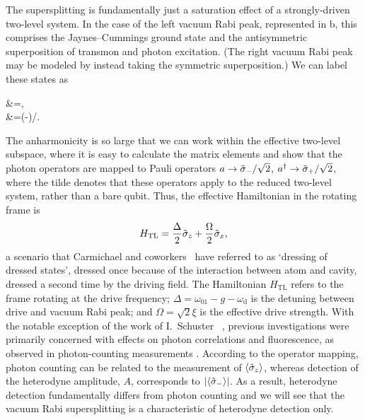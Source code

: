 The supersplitting is fundamentally just a saturation effect of a strongly-driven two-level system. In the case of the left vacuum Rabi peak, represented in b, this comprises the Jaynes--Cummings ground state and the antisymmetric superposition of transmon and photon excitation. (The right vacuum Rabi peak may be modeled by instead taking the symmetric superposition.) We can label these states as
\begin{subal}{\label{eq:dressdress}}
    \ket{\downarrow}&=,\quad{}\\
    \ket{\uparrow}&=(-)/.
\end{subal}
The anharmonicity is so large that we can work within the effective two-level subspace, where it is easy to calculate the matrix elements \cite{carmichael_statistical_2008} and show that the photon operators are mapped to Pauli operators $a\to\tilde{\sigma}_-/\sqrt{2}$, $a^\dag\to\tilde{\sigma}_+/\sqrt{2}$,%
where the tilde denotes that these operators apply to the reduced two-level system, rather than a bare qubit. Thus, the effective Hamiltonian in the rotating frame is
\begin{equation}\label{Htilde}
    H_\text{TL} = \frac{\Delta}{2}\tilde{\sigma}_z+\frac{\Omega}{2}\tilde{\sigma}_x,
\end{equation}%
a scenario that Carmichael and coworkers \cite{tian_quantum_1992, carmichael_statistical_2008}\ have referred to as `dressing of dressed states', dressed once because of the interaction between atom and cavity, dressed a second time by the driving field. The Hamiltonian $H_\text{TL}$ refers to the frame rotating at the drive frequency; $\Delta=\omega_{01} - g-\omega_\text{d}$ is the detuning between drive and vacuum Rabi peak; and $\Omega=\sqrt{2}\xi$ is the effective drive strength. With the notable exception of the work of I.~Schuster \etal\ \cite{schuster_nonlinear_2008}, previous investigations were primarily concerned with effects on photon correlations and fluorescence, as observed in photon-counting measurements \cite{tian_quantum_1992, birnbaum_photon_2005}. According to the operator mapping, photon counting can be related to the measurement of $\langle \tilde{\sigma}_z \rangle$, whereas detection of the heterodyne amplitude, $A$, corresponds to $\lvert\langle \tilde{\sigma}_-\rangle\rvert$. As a result, heterodyne detection fundamentally differs from photon counting and we will see that the vacuum Rabi supersplitting is a characteristic of heterodyne detection only.


